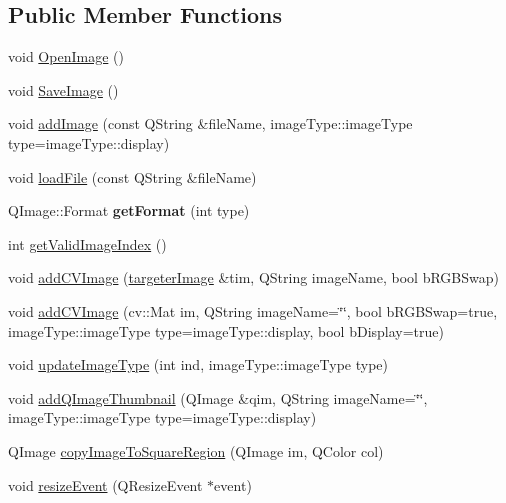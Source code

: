 \subsection*{Public Member Functions}
\begin{DoxyCompactItemize}
\item 
void \hyperlink{class_main_window_acea9cebdcf70bf45107baa0789e732bf}{Open\+Image} ()
\item 
void \hyperlink{class_main_window_aa816921e6ce14f558ada5c73c8a5ef20}{Save\+Image} ()
\item 
void \hyperlink{class_main_window_ab4d1f49d192d3641e0da68b5a69d014a}{add\+Image} (const Q\+String \&file\+Name, image\+Type\+::image\+Type type=image\+Type\+::display)
\item 
void \hyperlink{class_main_window_aa08469ed5c8396e60fa44bae6530bcf1}{load\+File} (const Q\+String \&file\+Name)
\item 
\mbox{\label{class_main_window_a15007754f8c9ca7ab8e2886fd321d33d}} 
Q\+Image\+::\+Format {\bfseries get\+Format} (int type)
\item 
int \hyperlink{class_main_window_acc35ff9a0c04d62297e7fd219fa869e5}{get\+Valid\+Image\+Index} ()
\item 
void \hyperlink{class_main_window_a0c29749703b7fc8a64a17d123816bfac}{add\+C\+V\+Image} (\hyperlink{classtargeter_image}{targeter\+Image} \&tim, Q\+String image\+Name, bool b\+R\+G\+B\+Swap)
\item 
void \hyperlink{class_main_window_ab87edc0e4b2fb3e4fb4df14a8872cbb4}{add\+C\+V\+Image} (cv\+::\+Mat im, Q\+String image\+Name=\char`\"{}\char`\"{}, bool b\+R\+G\+B\+Swap=true, image\+Type\+::image\+Type type=image\+Type\+::display, bool b\+Display=true)
\item 
void \hyperlink{class_main_window_a171b0591a4f66b4b16a33d4af5c35465}{update\+Image\+Type} (int ind, image\+Type\+::image\+Type type)
\item 
void \hyperlink{class_main_window_a8b60c57f82b0ac86df7c64692294a35e}{add\+Q\+Image\+Thumbnail} (Q\+Image \&qim, Q\+String image\+Name=\char`\"{}\char`\"{}, image\+Type\+::image\+Type type=image\+Type\+::display)
\item 
Q\+Image \hyperlink{class_main_window_a5e034c81127e2a14248eb81414e1e96e}{copy\+Image\+To\+Square\+Region} (Q\+Image im, Q\+Color col)
\item 
void \hyperlink{class_main_window_ae12f8f63791595567b6250f8bb002bda}{resize\+Event} (Q\+Resize\+Event $\ast$event)

\end{DoxyCompactItemize}
